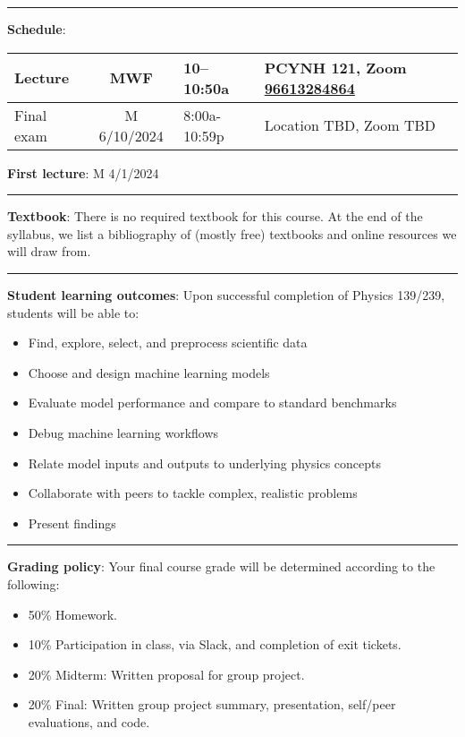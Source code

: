 \documentclass[12pt]{article}
\begin{document}
\begin{center}
	\rule{\textwidth}{0.5pt}
\end{center}

\noindent\textbf{Schedule}:
\begin{center}
	\begin{tabular}{|l|c|l|m{60mm}|}
		\hline
		Lecture    & MWF         & 10--10:50a   & PCYNH	121, Zoom \href{https://ucsd.zoom.us/j/96613284864}{96613284864} \\\hline
		Final exam & M 6/10/2024 & 8:00a-10:59p & Location TBD, Zoom TBD                                                 \\\hline
	\end{tabular}
\end{center}

\noindent\textbf{First lecture}: M 4/1/2024

\begin{center}
	\rule{\textwidth}{0.5pt}
\end{center}

\noindent\textbf{Textbook}: There is no required textbook for this course.
At the end of the syllabus, we list a bibliography of (mostly free) textbooks and online resources we will draw from.

\begin{center}
	\rule{\textwidth}{0.5pt}
\end{center}

\noindent\textbf{Student learning outcomes}: Upon successful completion of Physics 139/239, students will be able to:
\begin{itemize}
	\item Find, explore, select, and preprocess scientific data
	\item Choose and design machine learning models
	\item Evaluate model performance and compare to standard benchmarks
	\item Debug machine learning workflows
	\item Relate model inputs and outputs to underlying physics concepts
	\item Collaborate with peers to tackle complex, realistic problems
	\item Present findings
\end{itemize}

\begin{center}
	\rule{\textwidth}{0.5pt}
\end{center}

\noindent\textbf{Grading policy}: Your final course grade will be determined according to the following:
\begin{itemize}
	\item 50\% Homework.
	\item 10\% Participation in class, via Slack, and completion of exit tickets.
	\item 20\% Midterm: Written proposal for group project.
	\item 20\% Final: Written group project summary, presentation, self/peer evaluations, and code.
\end{itemize}
\end{document}
